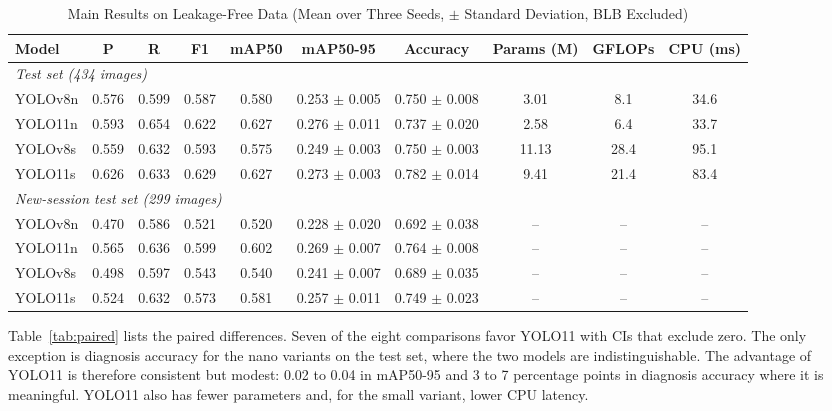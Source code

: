 \documentclass[conference]{IEEEtran}
\begin{document}
\begin{table}[htbp]
\caption{Main Results on Leakage-Free Data (Mean over Three Seeds, $\pm$ Standard Deviation, BLB Excluded)}
\begin{center}
\setlength{\tabcolsep}{4pt}
\begin{tabular}{|l|c|c|c|c|c|c|c|c|c|}
\hline
\textbf{Model} & \textbf{P} & \textbf{R} & \textbf{F1} & \textbf{mAP50} & \textbf{mAP50-95} & \textbf{Accuracy} & \textbf{Params (M)} & \textbf{GFLOPs} & \textbf{CPU (ms)} \\
\hline
\multicolumn{10}{|l|}{\textit{Test set (434 images)}} \\
\hline
YOLOv8n & 0.576 & 0.599 & 0.587 & 0.580 & 0.253 $\pm$ 0.005 & 0.750 $\pm$ 0.008 & 3.01 & 8.1 & 34.6 \\
YOLO11n & 0.593 & 0.654 & 0.622 & 0.627 & 0.276 $\pm$ 0.011 & 0.737 $\pm$ 0.020 & 2.58 & 6.4 & 33.7 \\
YOLOv8s & 0.559 & 0.632 & 0.593 & 0.575 & 0.249 $\pm$ 0.003 & 0.750 $\pm$ 0.003 & 11.13 & 28.4 & 95.1 \\
YOLO11s & 0.626 & 0.633 & 0.629 & 0.627 & 0.273 $\pm$ 0.003 & 0.782 $\pm$ 0.014 & 9.41 & 21.4 & 83.4 \\
\hline
\multicolumn{10}{|l|}{\textit{New-session test set (299 images)}} \\
\hline
YOLOv8n & 0.470 & 0.586 & 0.521 & 0.520 & 0.228 $\pm$ 0.020 & 0.692 $\pm$ 0.038 & -- & -- & -- \\
YOLO11n & 0.565 & 0.636 & 0.599 & 0.602 & 0.269 $\pm$ 0.007 & 0.764 $\pm$ 0.008 & -- & -- & -- \\
YOLOv8s & 0.498 & 0.597 & 0.543 & 0.540 & 0.241 $\pm$ 0.007 & 0.689 $\pm$ 0.035 & -- & -- & -- \\
YOLO11s & 0.524 & 0.632 & 0.573 & 0.581 & 0.257 $\pm$ 0.011 & 0.749 $\pm$ 0.023 & -- & -- & -- \\
\hline
\end{tabular}
\par\vspace{2pt}{\scriptsize P, R, F1, and mAP refer to lesion detection; accuracy refers to image-level diagnosis. CPU latency at batch size 1, FP32, 640 pixels.}
\label{tab:main}
\end{center}
\end{table}

Table~\ref{tab:paired} lists the paired differences. Seven of the eight comparisons favor YOLO11 with CIs that exclude zero. The only exception is diagnosis accuracy for the nano variants on the test set, where the two models are indistinguishable. The advantage of YOLO11 is therefore consistent but modest: 0.02 to 0.04 in mAP50-95 and 3 to 7 percentage points in diagnosis accuracy where it is meaningful. YOLO11 also has fewer parameters and, for the small variant, lower CPU latency.
\end{document}

